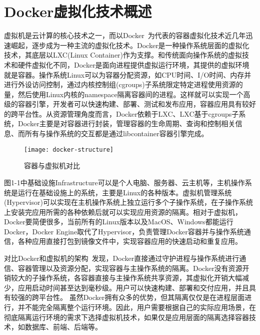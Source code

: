 \section{Docker虚拟化技术概述}
虚拟机是云计算的核心技术之一，而以Docker~\cite{2015Docker}为代表的容器虚拟化技术近几年迅速崛起，逐步成为一种主流的虚拟化技术。Docker是一种操作系统层面的虚拟化技术，其底层以LXC(Linux Container)作为支撑。和传统面向操作系统的虚拟技术和硬件虚拟化不同，Docker是面向进程提供虚拟运行环境，其提供的虚拟环境就是容器。操作系统Linux可以为容器分配资源，如CPU时间、I/O时间、内存并进行外设访问控制，通过内核控制组(cgroups)子系统限定特定进程使用资源的量，然后使用Linux内核的namespace隔离容器间的进程。这样就可以实现一个高级的容器引擎，开发者可以快速构建、部署、测试和发布应用，容器应用具有较好的跨平台性。从资源管理角度而言，Docker依赖于LXC、LXC基于cgroups子系统，Docker主要是对容器进行封装，管理容器的生命周期、查询和控制相关信息、而所有与操作系统的交互都是通过libcontainer容器引擎完成。
\begin{figure}[H] %
	\centering
	\texttt{[image: docker-structure]}
	\caption{容器与虚拟机对比}
\end{figure}
图1-1中基础设施Infrastructure可以是个人电脑、服务器、云主机等，主机操作系统是运行在基础设施上的系统，主要是Linux的各种版本。虚拟机管理系统(Hypervisor)可以实现在主机操作系统上独立运行多个子操作系统，在子操作系统上安装完应用所需的各种依赖后就可以实现应用资源的隔离。相对于虚拟机，Docker要简便很多，当前所有的Linux版本以及MacOS、Windows都能运行Docker，Docker Engine取代了Hypervisor，负责管理Docker容器并与操作系统通信，各种应用直接打包到镜像文件中，实现容器应用的快速启动和重复应用。

对比Docker和虚拟机的架构~\cite{Barik2017Performance, Felter2007An}发现，Docker直接通过守护进程与操作系统进行通信、容器管理以及资源分配，实现容器与主操作系统的隔离。Docker没有资源开销较大的子操作系统，各容器直接与主操作系统共享资源，其虚拟化开销大幅减少，应用启动时间甚至达到毫秒级。用户可以快速构建、部署和交付应用，并且具有较强的跨平台性。
虽然Docker拥有众多的优势，但其隔离仅仅是在进程层面进行，并不能完全隔离整个运行环境。因此，用户需要根据自己的实际应用场景，在彻底隔离运行环境的需求下选择虚拟机技术，如果仅是应用层面的隔离选择容器技术，如数据库、前端、后端等。

